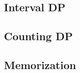 \documentclass{article}
\begin{document}
\begin{center}
	\inputminted{cpp}{src/longest-common-subsequence.cpp}
\end{center}



\subsection{Interval DP}
\subsection{Counting DP}
\subsection{Memorization}
\end{document}
